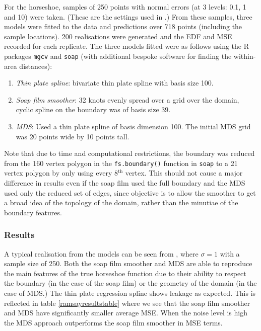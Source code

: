 For the horseshoe, samples of 250 points with normal errors (at 3 levels: 0.1, 1 and 10) were taken. (These are the settings used in \cite{soap}.) From these samples, three models were fitted to the data and predictions over 718 points (including the sample locations). 200 realisations were generated and the EDF and MSE recorded for each replicate. The three models fitted were as follows using the \textsf{R} packages \texttt{mgcv} and \texttt{soap} (with additional bespoke software for finding the within-area distances):

\begin{enumerate}
\item \emph{Thin plate spline}: bivariate thin plate spline with basis size 100.
\item \emph{Soap film smoother}: 32 knots evenly spread over a grid over the domain, cyclic spline on the boundary was of basis size 39.
\item \emph{MDS}: Used a thin plate spline of basis dimension 100. The initial MDS grid was 20 points wide by 10 points tall.
\end{enumerate} 

Note that due to time and computational restrictions, the boundary was reduced from the 160 vertex polygon in the \texttt{fs.boundary()} function in \texttt{soap} to a 21 vertex polygon by only using every 8$^\text{th}$ vertex. This should not cause a major difference in results even if the soap film used the full boundary and the MDS used only the reduced set of edges, since objective is to allow the smoother to get a broad idea of the topology of the domain, rather than the minutiae of the boundary features.

\subsubsection{Results}

A typical realisation from the models can be seen from , where $\sigma=1$ with a sample size of 250. Both the soap film smoother and MDS are able to reproduce the main features of the true horseshoe function due to their ability to respect the boundary (in the case of the soap film) or the geometry of the domain (in the case of MDS.) The thin plate regression spline shows leakage as expected. This is reflected in table \ref{ramsayresultstable} where we see that the soap film smoother and MDS have significantly smaller average MSE. When the noise level is high the MDS approach outperforms the soap film smoother in MSE terms.

